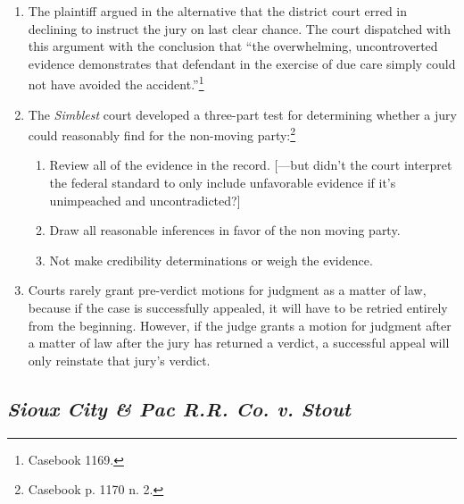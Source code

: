 \begin{enumerate}
    \item The plaintiff argued in the alternative that the district court 
    erred in declining to instruct the jury on last clear chance. The court 
    dispatched with this argument with the conclusion that ``the overwhelming, 
    uncontroverted evidence demonstrates that defendant in the exercise of due 
    care simply could not have avoided the accident.''\footnote{Casebook 
    1169.}
    \item The \emph{Simblest} court developed a three-part test for 
    determining whether a jury could reasonably find for the non-moving 
    party:\footnote{Casebook p. 1170 n. 2.}
    \begin{enumerate}
        \item Review all of the evidence in the record. [---but didn't the 
        court interpret the federal standard to only include unfavorable 
        evidence if it's unimpeached and uncontradicted?]
        \item Draw all reasonable inferences in favor of the non moving party.
        \item Not make credibility determinations or weigh the evidence.
    \end{enumerate}
    \item Courts rarely grant pre-verdict motions for judgment as a matter of 
    law, because if the case is successfully appealed, it will have to be 
    retried entirely from the beginning. However, if the judge grants a motion 
    for judgment after a matter of law after the jury has returned a verdict, 
    a successful appeal will only reinstate that jury's verdict.
\end{enumerate}

\subsection{\emph{Sioux City \& Pac R.R. Co. v. Stout}}

